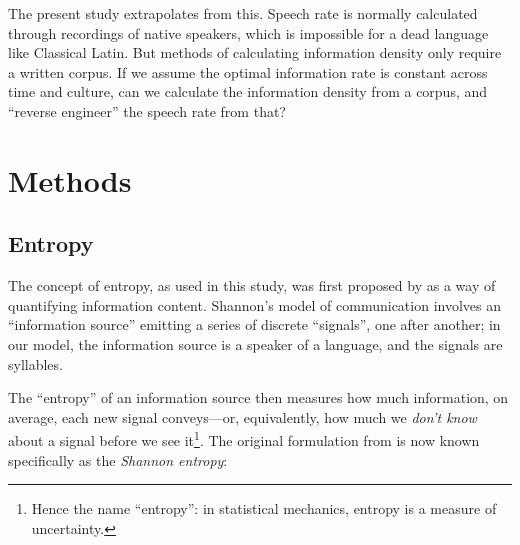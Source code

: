 \documentclass[12pt,twoside]{article}
\begin{document}
The present study extrapolates from this. Speech rate is normally calculated through recordings of native speakers, which is impossible for a dead language like Classical Latin. But  methods of calculating information density only require a written corpus. If we assume the optimal information rate is constant across time and culture, can we calculate the information density from a corpus, and ``reverse engineer'' the speech rate from that?




\section{Methods}
\label{sec:meth}

\subsection{Entropy}
\label{subsec:entropy}

The concept of entropy, as used in this study, was first proposed by \citet{shannon} as a way of quantifying information content. Shannon's model of communication involves an ``information source'' emitting a series of discrete ``signals'', one after another; in our model, the information source is a speaker of a language, and the signals are syllables.

The ``entropy'' of an information source then measures how much information, on average, each new signal conveys---or, equivalently, how much we \emph{don't know} about a signal before we see it\footnote{Hence the name ``entropy'': in statistical mechanics, entropy is a measure of uncertainty.}. The original formulation from \citet[50]{shannon} is now known specifically as the \emph{Shannon entropy}:
\end{document}
